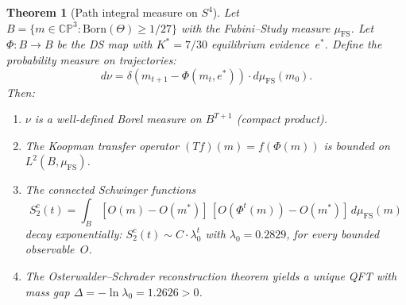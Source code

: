 \documentclass[11pt,a4paper]{article}
\newtheorem{theorem}{Theorem}[section]
\theoremstyle{definition}
\theoremstyle{remark}
\newcommand{\CP}{\mathbb{CP}}
\begin{document}
\begin{theorem}[Path integral measure on $S^4$]\label{thm:measure}
Let $B=\{m\in\CP^3:\mathrm{Born}(\Theta)\geq 1/27\}$ with the Fubini--Study measure $\mu_{\mathrm{FS}}$. Let $\Phi:B\to B$ be the DS map with $K^*=7/30$ equilibrium evidence~$e^*$. Define the probability measure on trajectories:
\begin{equation}\label{eq:measure}
d\nu=\delta(m_{t+1}-\Phi(m_t,e^*))\cdot d\mu_{\mathrm{FS}}(m_0).
\end{equation}
Then:
\begin{enumerate}[nosep]
\item $\nu$ is a well-defined Borel measure on $B^{T+1}$ (compact product).
\item The Koopman transfer operator $(Tf)(m)=f(\Phi(m))$ is bounded on $L^2(B,\mu_{\mathrm{FS}})$.
\item The connected Schwinger functions
\begin{equation}\label{eq:schwinger}
S_2^c(t)=\int_B[O(m)-O(m^*)]\,[O(\Phi^t(m))-O(m^*)]\,d\mu_{\mathrm{FS}}(m)
\end{equation}
decay exponentially: $S_2^c(t)\sim C\cdot\lambda_0^t$ with $\lambda_0=0.2829$, for every bounded observable~$O$.
\item The Osterwalder--Schrader reconstruction theorem yields a unique QFT with mass gap $\Delta=-\ln\lambda_0=1.2626>0$.
\end{enumerate}
\end{theorem}
\end{document}
